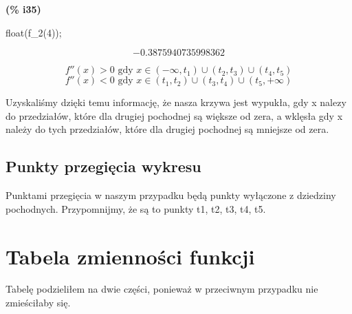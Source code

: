 \documentclass[a4paper]{article}
\begin{document}
\begin{itemize}
\noindent
\begin{minipage}[t]{4.000000em}\color{red}\bfseries
(\% i35)	
\end{minipage}
\begin{minipage}[t]{\textwidth}\color{blue}
float(f\_2(4));
\end{minipage}
\[\displaystyle \tag{\% o35} 
-0.3875940735998362\mbox{}
\]

\end{itemize}



\begin{equation*}
	f''(x)>0 \mbox{ gdy } x \in (-\infty,t_1) \cup (t_2,t_3) \cup (t_4,t_5)
\end{equation*}
\begin{equation*}
	f''(x)<0 \mbox{ gdy } x \in (t_1,t_2) \cup (t_3,t_4) \cup (t_5,+\infty)
\end{equation*}

Uzyskaliśmy dzięki temu informację, że nasza krzywa jest wypukła, gdy x nalezy do przedziałów, które dla drugiej pochodnej są większe od zera, a wklęsła gdy x należy do tych przedziałów, które dla drugiej pochodnej są mniejsze od zera.


\pagebreak
\subsection{Punkty przegięcia wykresu}
Punktami przegięcia w naszym przypadku będą punkty wyłączone z dziedziny pochodnych. Przypomnijmy, że są to punkty t1, t2, t3, t4, t5.

\section{Tabela zmienności funkcji}
Tabelę podzieliłem na dwie części, ponieważ w przeciwnym przypadku nie zmieściłaby się.
\end{document}
